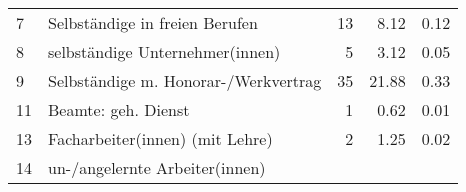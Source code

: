 \begin{longtable}{lXrrr}
     7 &
     \multicolumn{1}{X}{ Selbständige in freien Berufen   } &


       \num{13} &
       \num[round-mode=places,round-precision=2]{8.12} &
         \num[round-mode=places,round-precision=2]{0.12} \\

     8 &
     \multicolumn{1}{X}{ selbständige Unternehmer(innen)   } &


       \num{5} &
       \num[round-mode=places,round-precision=2]{3.12} &
         \num[round-mode=places,round-precision=2]{0.05} \\

     9 &
     \multicolumn{1}{X}{ Selbständige m. Honorar-/Werkvertrag   } &


       \num{35} &
       \num[round-mode=places,round-precision=2]{21.88} &
         \num[round-mode=places,round-precision=2]{0.33} \\

     11 &
     \multicolumn{1}{X}{ Beamte: geh. Dienst   } &


       \num{1} &
       \num[round-mode=places,round-precision=2]{0.62} &
         \num[round-mode=places,round-precision=2]{0.01} \\

     13 &
     \multicolumn{1}{X}{ Facharbeiter(innen) (mit Lehre)   } &


       \num{2} &
       \num[round-mode=places,round-precision=2]{1.25} &
         \num[round-mode=places,round-precision=2]{0.02} \\

     14 &
     \multicolumn{1}{X}{ un-/angelernte Arbeiter(innen)   } &



\end{longtable}

